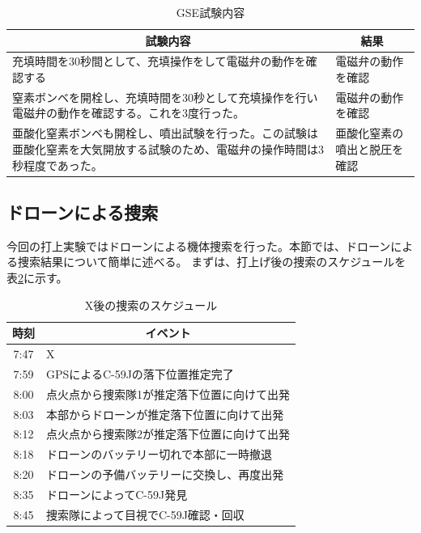 \documentclass[a4paper,11pt,uplatex]{jsarticle}
\begin{document}
\begin{table}[H]
	\centering
	\caption{GSE試験内容}
	\begin{tabular}{p{90mm}l} \toprule
		\multicolumn{1}{c}{試験内容}                                        & \multicolumn{1}{c}{結果} \\  \midrule
		充填時間を30秒間として、充填操作をして電磁弁の動作を確認する                                 & 電磁弁の動作を確認              \\ \midrule
		窒素ボンベを開栓し、充填時間を30秒として充填操作を行い電磁弁の動作を確認する。これを3度行った。               & 電磁弁の動作を確認              \\ \midrule
		亜酸化窒素ボンベも開栓し、噴出試験を行った。この試験は亜酸化窒素を大気開放する試験のため、電磁弁の操作時間は3秒程度であった。 & 亜酸化窒素の噴出と脱圧を確認         \\
		\bottomrule
	\end{tabular}
	\label{gse_mokuteki}
\end{table}

\subsection{ドローンによる捜索}
今回の打上実験ではドローンによる機体捜索を行った。本節では、ドローンによる捜索結果について簡単に述べる。
まずは、打上げ後の捜索のスケジュールを表\ref{tab:find}に示す。

\begin{table}[H]
	\centering
	\caption{X後の捜索のスケジュール}
	\begin{tabular}{cl} \toprule
		時刻   & \multicolumn{1}{c}{イベント} \\ \midrule
		7:47 & X                        \\
		7:59 & GPSによるC-59Jの落下位置推定完了     \\
		8:00 & 点火点から捜索隊1が推定落下位置に向けて出発   \\
		8:03 & 本部からドローンが推定落下位置に向けて出発    \\
		8:12 & 点火点から捜索隊2が推定落下位置に向けて出発   \\
		8:18 & ドローンのバッテリー切れで本部に一時撤退     \\
		8:20 & ドローンの予備バッテリーに交換し、再度出発    \\
		8:35 & ドローンによってC-59J発見          \\
		8:45 & 捜索隊によって目視でC-59J確認・回収     \\
		\bottomrule
	\end{tabular}
	\label{tab:find}
\end{table}
\end{document}
